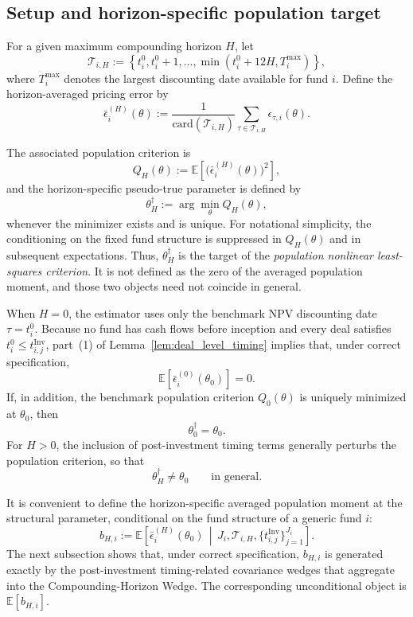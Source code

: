 \subsection{Setup and horizon-specific population target}
\label{sec:appendix_bv_setup}

For a given maximum compounding horizon $H$, let
\[
\mathcal{T}_{i,H}
:=
\left\{
t_i^0,t_i^0+1,\dots,\min(t_i^0+12H,T_i^{\max})
\right\},
\]
where $T_i^{\max}$ denotes the largest discounting date available for fund $i$.
Define the horizon-averaged pricing error by
\begin{equation}
	\label{eq:avg_eps_H}
	\bar{\epsilon}_i^{(H)}(\theta)
	:=
	\frac{1}{\mathrm{card}(\mathcal{T}_{i,H})}
	\sum_{\tau\in\mathcal{T}_{i,H}}
	\epsilon_{\tau,i}(\theta).
\end{equation}

The associated population criterion is
\begin{equation}
	\label{eq:QH}
	Q_H(\theta)
	:=
	\mathbb{E}\!\left[
	\bigl(\bar{\epsilon}_i^{(H)}(\theta)\bigr)^2
	\right],
\end{equation}
and the horizon-specific pseudo-true parameter is defined by
\begin{equation}
	\label{eq:pseudotrue}
	\theta_H^\dagger
	:=
	\arg\min_{\theta} Q_H(\theta),
\end{equation}
whenever the minimizer exists and is unique.
For notational simplicity, the conditioning on the fixed fund structure is suppressed in $Q_H(\theta)$ and in subsequent expectations.
Thus, $\theta_H^\dagger$ is the target of the \emph{population nonlinear least-squares criterion}.
It is not defined as the zero of the averaged population moment, and those two objects need not coincide in general.

When $H=0$, the estimator uses only the benchmark NPV discounting date $\tau=t_i^0$.
Because no fund has cash flows before inception and every deal satisfies $t_i^0\le t_{i,j}^{\mathrm{Inv}}$, part~(1) of Lemma~\ref{lem:deal_level_timing} implies that, under correct specification,
\[
\mathbb{E}\!\left[
\bar{\epsilon}_i^{(0)}(\theta_0)
\right]
=
0.
\]
If, in addition, the benchmark population criterion $Q_0(\theta)$ is uniquely minimized at $\theta_0$, then
\[
\theta_0^\dagger=\theta_0.
\]
For $H>0$, the inclusion of post-investment timing terms generally perturbs the population criterion, so that
\[
\theta_H^\dagger\neq \theta_0
\qquad\text{in general.}
\]

It is convenient to define the horizon-specific averaged population moment at the structural parameter, conditional on the fund structure of a generic fund $i$:
\begin{equation}
	\label{eq:bH_def}
	b_{H,i}
	:=
	\mathbb{E}\!\left[
	\bar{\epsilon}_i^{(H)}(\theta_0)
	\,\middle|\,
	J_i,\mathcal{T}_{i,H},\{t_{i,j}^{\mathrm{Inv}}\}_{j=1}^{J_i}
	\right].
\end{equation}
The next subsection shows that, under correct specification, $b_{H,i}$ is generated exactly by the post-investment timing-related covariance wedges that aggregate into the Compounding-Horizon Wedge.
The corresponding unconditional object is $\mathbb{E}[b_{H,i}]$.
